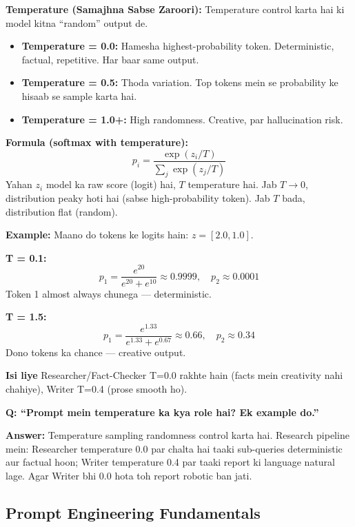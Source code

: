 \documentclass[11pt, a4paper]{article}
\begin{document}
\begin{conceptbox}
\textbf{Temperature (Samajhna Sabse Zaroori):} Temperature control karta hai ki model kitna ``random'' output de.

\begin{itemize}
\item \textbf{Temperature = 0.0:} Hamesha highest-probability token. Deterministic, factual, repetitive. Har baar same output.
\item \textbf{Temperature = 0.5:} Thoda variation. Top tokens mein se probability ke hisaab se sample karta hai.
\item \textbf{Temperature = 1.0+:} High randomness. Creative, par hallucination risk.
\end{itemize}

\textbf{Formula (softmax with temperature):}
\[
p_i = \frac{\exp(z_i / T)}{\sum_j \exp(z_j / T)}
\]
Yahan $z_i$ model ka raw score (logit) hai, $T$ temperature hai. Jab $T \to 0$, distribution peaky hoti hai (sabse high-probability token). Jab $T$ bada, distribution flat (random).
\end{conceptbox}

\begin{mathbox}
\textbf{Example:} Maano do tokens ke logits hain: $z = [2.0, 1.0]$.

\textbf{T = 0.1:}
\[
p_1 = \frac{e^{20}}{e^{20}+e^{10}} \approx 0.9999, \quad p_2 \approx 0.0001
\]
Token 1 almost always chunega --- deterministic.

\textbf{T = 1.5:}
\[
p_1 = \frac{e^{1.33}}{e^{1.33}+e^{0.67}} \approx 0.66, \quad p_2 \approx 0.34
\]
Dono tokens ka chance --- creative output.

\textbf{Isi liye} Researcher/Fact-Checker T=0.0 rakhte hain (facts mein creativity nahi chahiye), Writer T=0.4 (prose smooth ho).
\end{mathbox}

\begin{interviewbox}
\textbf{Q: ``Prompt mein temperature ka kya role hai? Ek example do.''}

\textbf{Answer:} Temperature sampling randomness control karta hai. Research pipeline mein: Researcher temperature 0.0 par chalta hai taaki sub-queries deterministic aur factual hoon; Writer temperature 0.4 par taaki report ki language natural lage. Agar Writer bhi 0.0 hota toh report robotic ban jati.
\end{interviewbox}

\subsection{Prompt Engineering Fundamentals}
\end{document}

